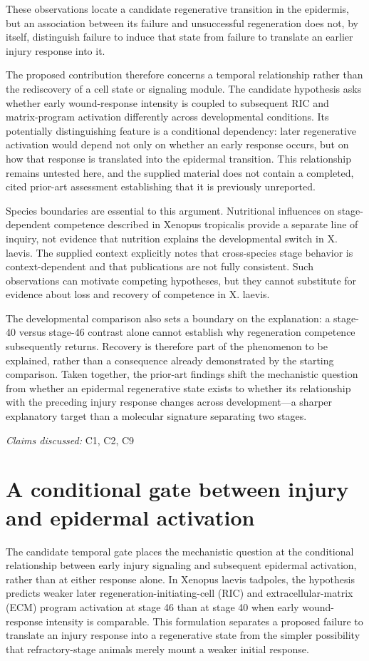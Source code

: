 \documentclass[11pt]{article}
\begin{document}
These observations locate a candidate regenerative transition in the epidermis, but an association between its failure and unsuccessful regeneration does not, by itself, distinguish failure to induce that state from failure to translate an earlier injury response into it.

The proposed contribution therefore concerns a temporal relationship rather than the rediscovery of a cell state or signaling module. The candidate hypothesis asks whether early wound-response intensity is coupled to subsequent RIC and matrix-program activation differently across developmental conditions. Its potentially distinguishing feature is a conditional dependency: later regenerative activation would depend not only on whether an early response occurs, but on how that response is translated into the epidermal transition. This relationship remains untested here, and the supplied material does not contain a completed, cited prior-art assessment establishing that it is previously unreported.

Species boundaries are essential to this argument. Nutritional influences on stage-dependent competence described in Xenopus tropicalis provide a separate line of inquiry, not evidence that nutrition explains the developmental switch in X. laevis. The supplied context explicitly notes that cross-species stage behavior is context-dependent and that publications are not fully consistent. Such observations can motivate competing hypotheses, but they cannot substitute for evidence about loss and recovery of competence in X. laevis.

The developmental comparison also sets a boundary on the explanation: a stage-40 versus stage-46 contrast alone cannot establish why regeneration competence subsequently returns. Recovery is therefore part of the phenomenon to be explained, rather than a consequence already demonstrated by the starting comparison. Taken together, the prior-art findings shift the mechanistic question from whether an epidermal regenerative state exists to whether its relationship with the preceding injury response changes across development—a sharper explanatory target than a molecular signature separating two stages.

\textit{Claims discussed: }C1, C2, C9
\section{A conditional gate between injury and epidermal activation}
The candidate temporal gate places the mechanistic question at the conditional relationship between early injury signaling and subsequent epidermal activation, rather than at either response alone. In Xenopus laevis tadpoles, the hypothesis predicts weaker later regeneration-initiating-cell (RIC) and extracellular-matrix (ECM) program activation at stage 46 than at stage 40 when early wound-response intensity is comparable. This formulation separates a proposed failure to translate an injury response into a regenerative state from the simpler possibility that refractory-stage animals merely mount a weaker initial response.
\end{document}
